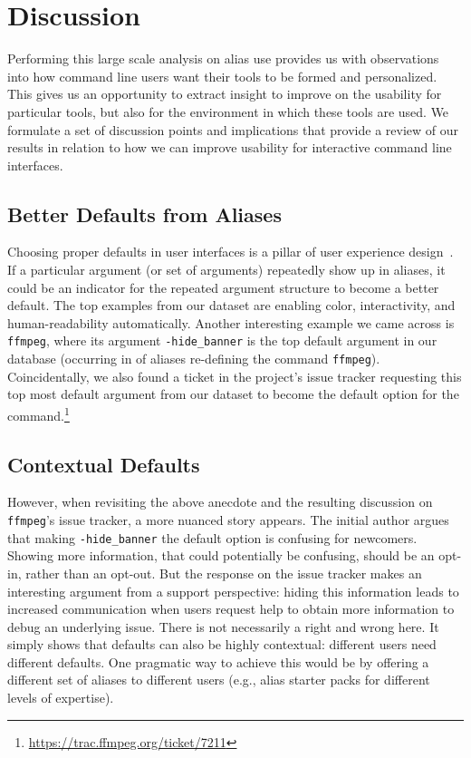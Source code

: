 \section{Discussion}

Performing this large scale analysis on alias use provides us with observations into how command line users want their tools to be formed and personalized.
This gives us an opportunity to extract insight to improve on the usability for particular tools, but also for the environment in which these tools are used.
We formulate a set of discussion points and implications that provide a review of our results in relation to how we can improve usability for interactive command line interfaces.

\subsection{Better Defaults from Aliases}

Choosing proper defaults in user interfaces is a pillar of user experience design~\cite{nielsen2005power}. 
If a particular argument (or set of arguments) repeatedly show up in aliases, it could be an indicator for the repeated argument structure to become a better default. 
The top examples from our dataset are enabling color, interactivity, and human-readability automatically.
Another interesting example we came across is \verb|ffmpeg|, where its argument \verb|-hide_banner| is the top default argument in our database (occurring in  of aliases re-defining the command \verb|ffmpeg|).
Coincidentally, we also found a ticket in the project's issue tracker requesting this top most default argument from our dataset to become the default option for the command.\footnote{\url{https://trac.ffmpeg.org/ticket/7211}}

\subsection{Contextual Defaults}

However, when revisiting the above anecdote and the resulting discussion on \verb|ffmpeg|'s issue tracker, a more nuanced story appears.
The initial author argues that making \verb|-hide_banner| the default option is confusing for newcomers.
Showing more information, that could potentially be confusing, should be an opt-in, rather than an opt-out.
But the response on the issue tracker makes an interesting argument from a support perspective: hiding this information leads to increased communication when users request help to obtain more information to debug an underlying issue.
There is not necessarily a right and wrong here.
It simply shows that defaults can also be highly contextual: different users need different defaults.
One pragmatic way to achieve this would be by offering a different set of aliases to different users (e.g., alias starter packs for different levels of expertise).


